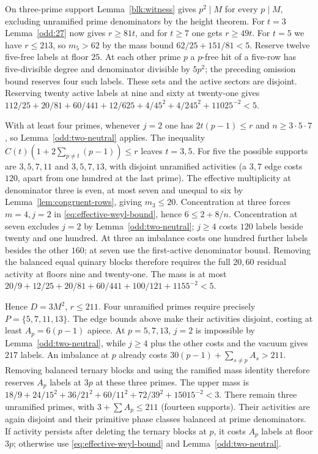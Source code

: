 \documentclass[11pt]{amsart}
\numberwithin{equation}{section}
\theoremstyle{definition}
\theoremstyle{plain}
\begin{document}
On three-prime support Lemma~\ref{blk:witness} gives $p^2\mid M$
for every $p\mid M$, excluding unramified prime denominators by the height theorem. For $t=3$ Lemma~\ref{odd:27}
now gives $r\ge81t$, and for $t\ge7$ one gets $r\ge49t$.
For $t=5$ we have $r\le213$, so $m_5>62$ by the mass bound
$62/25+151/81<5$. Reserve twelve five-free labels at floor $25$.
At each other prime $p$ a $p$-free hit of a five-row has five-divisible
degree and denominator divisible by $5p^2$; the preceding omission bound
reserves four such labels. These sets and the active sectors are disjoint.
Reserving twenty active labels at nine and sixty at twenty-one gives
$112/25+20/81+60/441+12/625+4/45^2+4/245^2+11025^{-2}<5$.

With at least four primes, whenever $j=2$ one has $2t(p-1)\le r$ and $n\ge3\cdot5\cdot7$, so Lemma~\ref{odd:two-neutral} applies. The inequality $C(t)(1+2\sum_{p\ne t}(p-1))\le r$
leaves $t=3,5$. For five the possible supports are $3,5,7,11$ and
$3,5,7,13$, with disjoint unramified activities (a $3,7$ edge costs
$120$, apart from one hundred at the last prime). The effective
multiplicity at denominator three is even, at most seven and unequal to
six by Lemma~\ref{lem:congruent-rows}, giving $m_3\le20$.
Concentration at three forces $m=4,j=2$ in \eqref{eq:effective-weyl-bound},
hence $6\le2+8/n$. Concentration at seven excludes $j=2$ by
Lemma~\ref{odd:two-neutral}; $j\ge4$ costs $120$ labels beside
twenty and one hundred. At three an imbalance costs one hundred
further labels besides the other $160$; at seven use the first-active
denominator bound. Removing the balanced equal quinary blocks therefore
requires the full $20,60$ residual activity at floors nine and
twenty-one. The mass is at most
$20/9+12/25+20/81+60/441+100/121+1155^{-2}<5$.

Hence $D=3M^2$, $r\le211$. Four unramified primes require precisely
$P=\{5,7,11,13\}$. The edge bounds above make their activities disjoint,
costing at least $A_p=6(p-1)$ apiece. At $p=5,7,13$, $j=2$ is impossible
by Lemma~\ref{odd:two-neutral}, while $j\ge4$ plus the other costs and the
vacuum gives $217$ labels. An imbalance at $p$ already costs
$30(p-1)+\sum_{s\ne p}A_s>211$. Removing balanced ternary blocks and
using the ramified mass identity therefore reserves $A_p$ labels at $3p$
at these three primes. The upper mass is
$18/9+24/15^2+36/21^2+60/11^2+72/39^2+15015^{-2}<3$.
There remain three unramified primes, with $3+\sum A_p\le211$ (fourteen
supports). Their activities are again disjoint and their primitive phase
classes balanced at prime denominators. If activity persists after
deleting the ternary blocks at $p$, it costs $A_p$ labels at floor $3p$;
otherwise use \eqref{eq:effective-weyl-bound} and Lemma~\ref{odd:two-neutral}.
\end{document}
